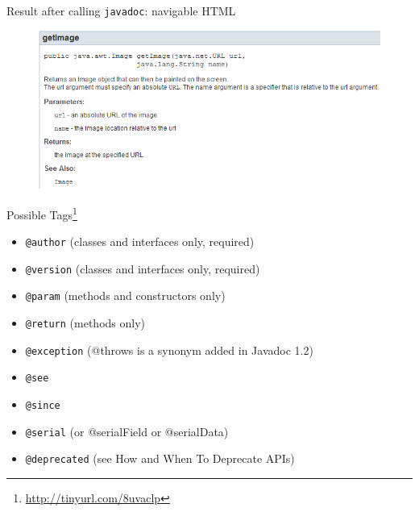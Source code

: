 \documentclass[English,c,%
hyperref={%
    pdftitle={FISA-DE2 JavaDoc},%
    pdfauthor={Muller, Gravier, Laforest, Subercaze},%
    pdfsubject={JavaDoc},%
    pdfkeywords={Java, JavaDoc},%
    colorlinks=true,%
    urlcolor=blue,%
    linkcolor=%
    },%
xcolor={pdftex,svgnames} %
]{beamer}
\begin{document}
\begin{frame}{Result after calling \texttt{javadoc}: navigable HTML}
  \begin{figure}
    \includegraphics[width=1\textwidth]{./images01/javadoc.png}
  \end{figure}
\end{frame}


\begin{frame}{Possible Tags\footnote{\url{http://tinyurl.com/8uvaclp}}}
  \begin{itemize}
    \item \texttt{@author} (classes and interfaces only, required)
    \item \texttt{@version} (classes and interfaces only, required)
    \item \texttt{@param} (methods and constructors only)
    \item \texttt{@return} (methods only)
    \item \texttt{@exception} (@throws is a synonym added in Javadoc 1.2)
    \item \texttt{@see}
    \item \texttt{@since}
    \item \texttt{@serial} (or @serialField or @serialData)
    \item \texttt{@deprecated} (see How and When To Deprecate APIs)
  \end{itemize}
\end{frame}
\end{document}
